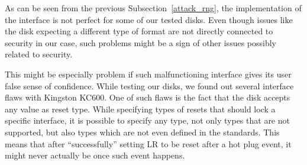 As can be seen from the previous Subsection~\ref{attack_rng}, the implementation of the interface is not perfect for some of our tested disks. Even though issues like the disk expecting a different type of format are not directly connected to security in our case, such problems might be a sign of other issues possibly related to security.

This might be especially problem if such malfunctioning interface gives its user false sense of confidence. While testing our disks, we found out several interface flaws with Kingston KC600. One of such flaws is the fact that the disk accepts any value as reset type. While specifying types of resets that should lock a specific interface, it is possible to specify any type, not only types that are not supported, but also types which are not even defined in the standards. This means that after ``successfully'' setting LR to be reset after a hot plug event, it might never actually be once such event happens.





